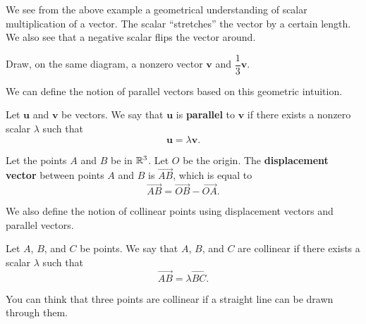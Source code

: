 \documentclass[12pt]{article}
\renewcommand{\vec}{\mathbf}
\begin{document}
We see from the above example a geometrical understanding of scalar multiplication of a vector.
The scalar ``stretches'' the vector by a certain length.
We also see that a negative scalar flips the vector around.

\begin{exc}
	Draw, on the same diagram, a nonzero vector \(\vec{v}\) and \(\dfrac{1}{3}\vec{v}\).
\end{exc}

We can define the notion of parallel vectors based on this geometric intuition.

\begin{defn}
	Let \(\vec{u}\) and \(\vec{v}\) be vectors.
	We say that \(\vec{u}\) is \textbf{parallel} to \(\vec{v}\) if there exists a nonzero scalar \(\lambda\) such that 
	\[ \vec{u} = \lambda \vec{v}. \] 
\end{defn}


\begin{defn}
	Let the points \(A\) and \(B\) be in \(\mathbb{R}^3\).
	Let \(O\) be the origin.
	The \textbf{displacement vector} between points \(A\) and \(B\) is \(\overrightarrow{AB}\), which is equal to
	\[ \overrightarrow{AB} = \overrightarrow{OB} - \overrightarrow{OA}. \] 
\end{defn}

We also define the notion of collinear points using displacement vectors and parallel vectors.

\begin{defn}
	Let \(A\), \(B\), and \(C\) be points.
	We say that \(A\), \(B\), and \(C\) are collinear if there exists a scalar \(\lambda\) such that 
	\[ \overrightarrow{AB} = \lambda \overrightarrow{BC}.\] 

	\begin{figure}[H]
		\centering
	\end{figure}
\end{defn}

You can think that three points are collinear if a straight line can be drawn through them.
\end{document}
